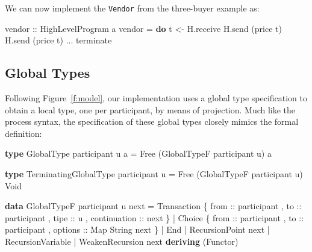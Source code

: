 \documentclass[runningheads,plain]{llncs}
\newenvironment{Shaded}{}{}
\newcommand{\KeywordTok}[1]{\textcolor[rgb]{0.00,0.44,0.13}{\textbf{#1}}}
\newcommand{\DataTypeTok}[1]{\textcolor[rgb]{0.56,0.13,0.00}{#1}}
\newcommand{\OtherTok}[1]{\textcolor[rgb]{0.00,0.44,0.13}{#1}}
\newcommand{\FunctionTok}[1]{\textcolor[rgb]{0.02,0.16,0.49}{#1}}
\newcommand{\NormalTok}[1]{#1}
\begin{document}
We can now implement the \texttt{Vendor} from the three-buyer example as:

\begin{Shaded}
\begin{Highlighting}[]
\OtherTok{vendor ::} \DataTypeTok{HighLevelProgram}\NormalTok{ a}
\NormalTok{vendor }\FunctionTok{=} \KeywordTok{do}
\NormalTok{    t }\OtherTok{<-}\NormalTok{ H.receive}
\NormalTok{    H.send (price t)}
\NormalTok{    H.send (price t)}
    \FunctionTok{...}
\NormalTok{    terminate}
\end{Highlighting}
\end{Shaded}

\subsection{Global Types}
Following Figure~\ref{f:model}, our implementation uses a global type specification to obtain a local type, one per participant, by means of projection. 
Much like the process syntax, the specification of these global types closely mimics the formal definition:

\begin{Shaded}
\begin{Highlighting}[]
\KeywordTok{type} \DataTypeTok{GlobalType}\NormalTok{ participant u a }\FunctionTok{=} 
    \DataTypeTok{Free}\NormalTok{ (}\DataTypeTok{GlobalTypeF}\NormalTok{ participant u) a }

\KeywordTok{type} \DataTypeTok{TerminatingGlobalType}\NormalTok{ participant u }\FunctionTok{=} 
    \DataTypeTok{Free}\NormalTok{ (}\DataTypeTok{GlobalTypeF}\NormalTok{ participant u) }\DataTypeTok{Void}

\KeywordTok{data} \DataTypeTok{GlobalTypeF}\NormalTok{ participant u next}
    \FunctionTok{=} \DataTypeTok{Transaction} 
\NormalTok{        \{}\OtherTok{ from ::}\NormalTok{ participant}
\NormalTok{        ,}\OtherTok{ to ::}\NormalTok{ participant}
\NormalTok{        ,}\OtherTok{ tipe ::}\NormalTok{ u}
\NormalTok{        ,}\OtherTok{ continuation ::}\NormalTok{  next }
\NormalTok{        \} }
    \FunctionTok{|} \DataTypeTok{Choice} 
\NormalTok{        \{}\OtherTok{ from ::}\NormalTok{ participant}
\NormalTok{        ,}\OtherTok{ to ::}\NormalTok{ participant}
\NormalTok{        ,}\OtherTok{ options ::} \DataTypeTok{Map} \DataTypeTok{String}\NormalTok{ next }
\NormalTok{        \}}
    \FunctionTok{|} \DataTypeTok{End}
    \FunctionTok{|} \DataTypeTok{RecursionPoint}\NormalTok{ next}
    \FunctionTok{|} \DataTypeTok{RecursionVariable}
    \FunctionTok{|} \DataTypeTok{WeakenRecursion}\NormalTok{ next}
    \KeywordTok{deriving}\NormalTok{ (}\DataTypeTok{Functor}\NormalTok{)}
\end{Highlighting}
\end{Shaded}
\end{document}
